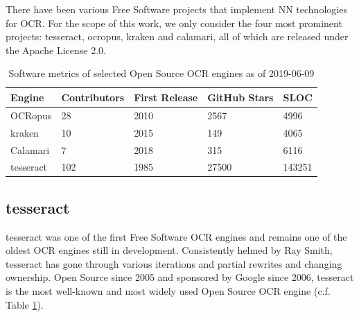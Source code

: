 \documentclass[sigconf]{acmart}
\begin{document}
There have been various Free Software projects that implement NN technologies
for OCR. For the scope of this work, we only consider the four most prominent projects: tesseract, ocropus, kraken and calamari, all of which are released under the Apache License 2.0.


\begin{table}[b]
\begin{tabular}{lllll}
\hline
Engine    & Contributors & First Release & GitHub Stars & SLOC \\ \hline
OCRopus   & 28           & 2010          & 2567         & 4996 \\
kraken    & 10           & 2015          & 149          & 4065 \\
Calamari  & 7            & 2018          & 315          & 6116 \\
tesseract & 102          & 1985          & 27500        & 143251 \\

\end{tabular}
\caption{Software metrics of selected Open Source OCR engines as of 2019-06-09}
\label{tab:stats}
\end{table}

\subsection{tesseract}

tesseract \cite{4376991} was one of the first Free Software OCR
engines \cite{Rice1995TheFA} and remains one of the oldest OCR engines still in
development. Consistently helmed by Ray Smith, tesseract has gone
through various iterations and partial rewrites and changing
ownership. Open Source since 2005 and sponsored by Google since
2006, tesseract is the most well-known and most widely used Open
Source OCR engine (c.f. Table \ref{tab:stats}).
\end{document}
